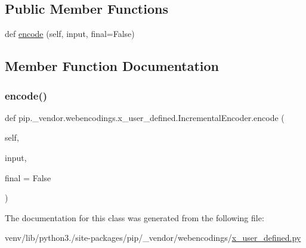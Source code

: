 \subsection*{Public Member Functions}
\begin{DoxyCompactItemize}
\item 
def \hyperlink{classpip_1_1__vendor_1_1webencodings_1_1x__user__defined_1_1IncrementalEncoder_ade48066f259fb1ebf54b15cb60db24bf}{encode} (self, input, final=False)
\end{DoxyCompactItemize}


\subsection{Member Function Documentation}
\mbox{\label{classpip_1_1__vendor_1_1webencodings_1_1x__user__defined_1_1IncrementalEncoder_ade48066f259fb1ebf54b15cb60db24bf}} 
\subsubsection{\texorpdfstring{encode()}{encode()}}
{\footnotesize\ttfamily def pip.\+\_\+vendor.\+webencodings.\+x\+\_\+user\+\_\+defined.\+Incremental\+Encoder.\+encode (\begin{DoxyParamCaption}\item[{}]{self,  }\item[{}]{input,  }\item[{}]{final = {\ttfamily False} }\end{DoxyParamCaption})}



The documentation for this class was generated from the following file\+:\begin{DoxyCompactItemize}
\item 
venv/lib/python3./site-\/packages/pip/\+\_\+vendor/webencodings/\hyperlink{x__user__defined_8py}{x\+\_\+user\+\_\+defined.\+py}\end{DoxyCompactItemize}
